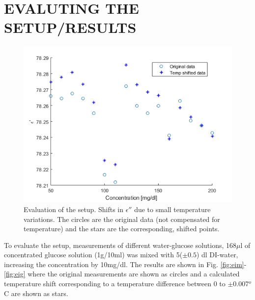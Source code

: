 \documentclass[10pt,final,conference,a4paper,twocolumn]{IEEEtran_AntennEMB_GigaHertz2016}
\begin{document}

\section{EVALUTING THE SETUP/RESULTS}
 \begin{figure}[b]
	\centering
	\includegraphics[width=1.0\columnwidth]{pumpgluzoomERE.png}
	\caption{Evaluation of the setup. Shifts in $\epsilon''$ due to small temperature variations. The circles are the original data (not compensated for temperature) and the stars are the corresponding, shifted points.}
	\label{fig:ere}
\end{figure}
To evaluate the setup, measurements of different water-glucose solutions, 168$\mu$l of concentrated glucose solution (1g/10ml) was mixed with 5($\pm0.5$) dl DI-water, increasing the concentration by 10mg/dl. The results are shown in Fig. \ref{fig:eim}-\ref{fig:eig} where the original measurements are shown as circles and a calculated temperature shift corresponding to a temperature difference between 0 to $\pm$0.007$^o$C are shown as stars.
\end{document}
